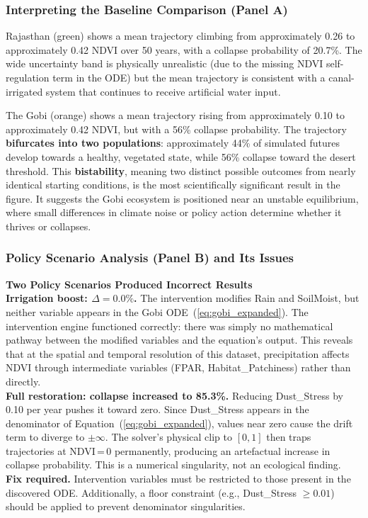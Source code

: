 \documentclass[12pt, a4paper]{article}
\begin{document}
\subsubsection{Interpreting the Baseline Comparison (Panel A)}

Rajasthan (green) shows a mean trajectory climbing from approximately 0.26
to approximately 0.42 NDVI over 50 years, with a collapse probability of
20.7\%. The wide uncertainty band is physically unrealistic (due to the
missing NDVI self-regulation term in the ODE) but the mean trajectory is
consistent with a canal-irrigated system that continues to receive
artificial water input.

The Gobi (orange) shows a mean trajectory rising from approximately 0.10
to approximately 0.42 NDVI, but with a 56\% collapse probability. The
trajectory \textbf{bifurcates into two populations}: approximately 44\%
of simulated futures develop towards a healthy, vegetated state, while
56\% collapse toward the desert threshold. This \textbf{bistability},
meaning two distinct possible outcomes from nearly identical starting
conditions, is the most scientifically significant result in the figure.
It suggests the Gobi ecosystem is positioned near an unstable equilibrium,
where small differences in climate noise or policy action determine whether
it thrives or collapses.

\subsubsection{Policy Scenario Analysis (Panel B) and Its Issues}

\begin{mdframed}[style=warnbox]
\textbf{\textcolor{warnred}{Two Policy Scenarios Produced Incorrect
Results}}\\[6pt]
\textbf{Irrigation boost: $\Delta = 0.0\%$.}
The intervention modifies Rain and SoilMoist, but neither variable appears
in the Gobi ODE~(\ref{eq:gobi_expanded}). The intervention engine
functioned correctly: there was simply no mathematical pathway between the
modified variables and the equation's output. This reveals that at the
spatial and temporal resolution of this dataset, precipitation affects NDVI
through intermediate variables (FPAR, Habitat\_Patchiness) rather than
directly.\\[6pt]
\textbf{Full restoration: collapse increased to 85.3\%.}
Reducing Dust\_Stress by 0.10 per year pushes it toward zero. Since
Dust\_Stress appears in the denominator of Equation~(\ref{eq:gobi_expanded}),
values near zero cause the drift term to diverge to $\pm\infty$. The
solver's physical clip to $[0,1]$ then traps trajectories at NDVI\,=\,0
permanently, producing an artefactual increase in collapse probability.
This is a numerical singularity, not an ecological finding.\\[4pt]
\textbf{Fix required.} Intervention variables must be restricted to those
present in the discovered ODE. Additionally, a floor constraint
(e.g., Dust\_Stress $\geq 0.01$) should be applied to prevent
denominator singularities.
\end{mdframed}
\end{document}
